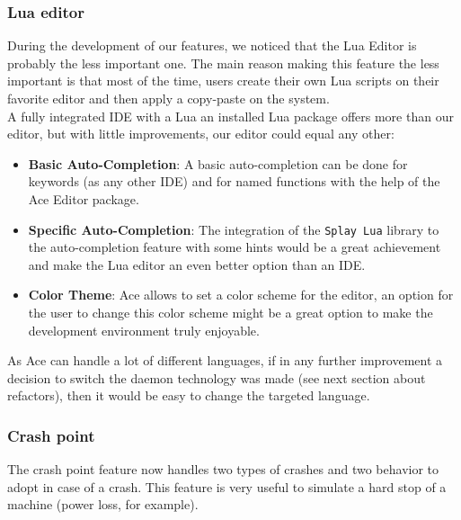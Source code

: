 \documentclass{eplmastersthesis}
\begin{document}
        \subsubsection{Lua editor}

        During the development of our features, we noticed that the Lua Editor
        is probably the less important one. The main reason making this feature
        the less important is that most of the time, users create their own Lua
        scripts on their favorite editor and then apply a copy-paste on the
        system.\\
        A fully integrated IDE with a Lua an installed Lua package offers more
        than our editor, but with little improvements, our editor could equal
        any other:

        \begin{itemize}
          \item \textbf{Basic Auto-Completion}: A basic auto-completion can be
          done for keywords (as any other IDE) and for named functions with
          the help of the Ace Editor package.
          \item \textbf{Specific Auto-Completion}: The integration of the \texttt{Splay
          Lua} library to the auto-completion feature with some hints would
          be a great achievement and make the Lua editor an even better
          option than an IDE.
          \item \textbf{Color Theme}: Ace allows to set a color scheme for
          the editor, an option for the user to change this color scheme
          might be a great option to make the development environment
          truly enjoyable.
        \end{itemize}

        As Ace can handle a lot of different languages, if in any further
        improvement a decision to switch the daemon technology was made (see
        next section about refactors), then it would be easy to change the
        targeted language.

        \subsubsection{Crash point}

          The crash point feature now handles two types of crashes and two
          behavior to adopt in case of a crash. This feature is very useful
          to simulate a hard stop of a machine (power loss, for example).\\
\end{document}
